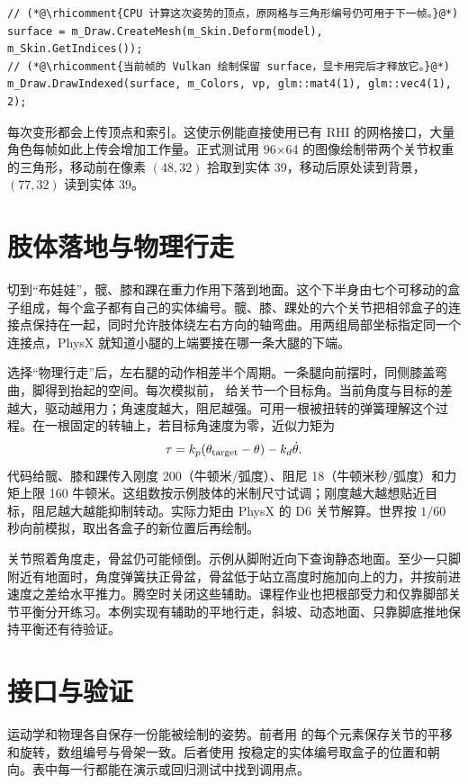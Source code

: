 \begin{lstlisting}[style=besidetext]
// (*@\rhicomment{CPU 计算这次姿势的顶点，原网格与三角形编号仍可用于下一帧。}@*)
surface = m_Draw.CreateMesh(m_Skin.Deform(model), m_Skin.GetIndices());
// (*@\rhicomment{当前帧的 Vulkan 绘制保留 surface，显卡用完后才释放它。}@*)
m_Draw.DrawIndexed(surface, m_Colors, vp, glm::mat4(1), glm::vec4(1), 2);
\end{lstlisting}

每次变形都会上传顶点和索引。这使示例能直接使用已有 RHI 的网格接口，大量角色每帧如此上传会增加工作量。正式测试用 96×64 的图像绘制带两个关节权重的三角形，移动前在像素 $(48,32)$ 拾取到实体 39，移动后原处读到背景，$(77,32)$ 读到实体 39。

\clearpage
\section{肢体落地与物理行走}
切到“布娃娃”，髋、膝和踝在重力作用下落到地面。这个下半身由七个可移动的盒子组成，每个盒子都有自己的实体编号。髋、膝、踝处的六个关节把相邻盒子的连接点保持在一起，同时允许肢体绕左右方向的轴弯曲。用两组局部坐标指定同一个连接点，PhysX 就知道小腿的上端要接在哪一条大腿的下端。


选择“物理行走”后，左右腿的动作相差半个周期。一条腿向前摆时，同侧膝盖弯曲，脚得到抬起的空间。每次模拟前， 给关节一个目标角。当前角度与目标的差越大，驱动越用力；角速度越大，阻尼越强。可用一根被扭转的弹簧理解这个过程。在一根固定的转轴上，若目标角速度为零，近似力矩为
\[
             \tau=k_p(\theta_{\rm target}-\theta)-k_d\dot\theta .
\]
代码给髋、膝和踝传入刚度 200（牛顿米/弧度）、阻尼 18（牛顿米秒/弧度）和力矩上限 160 牛顿米。这组数按示例肢体的米制尺寸试调；刚度越大越想贴近目标，阻尼越大越能抑制转动。实际力矩由 PhysX 的 D6 关节解算。世界按 $1/60$ 秒向前模拟，取出各盒子的新位置后再绘制。

关节照着角度走，骨盆仍可能倾倒。示例从脚附近向下查询静态地面。至少一只脚附近有地面时，角度弹簧扶正骨盆，骨盆低于站立高度时施加向上的力，并按前进速度之差给水平推力。腾空时关闭这些辅助。课程作业也把根部受力和仅靠脚部关节平衡分开练习。本例实现有辅助的平地行走，斜坡、动态地面、只靠脚底推地保持平衡还有待验证。

\clearpage
\section{接口与验证}
运动学和物理各自保存一份能被绘制的姿势。前者用  的每个元素保存关节的平移和旋转，数组编号与骨架一致。后者使用  按稳定的实体编号取盒子的位置和朝向。表中每一行都能在演示或回归测试中找到调用点。


